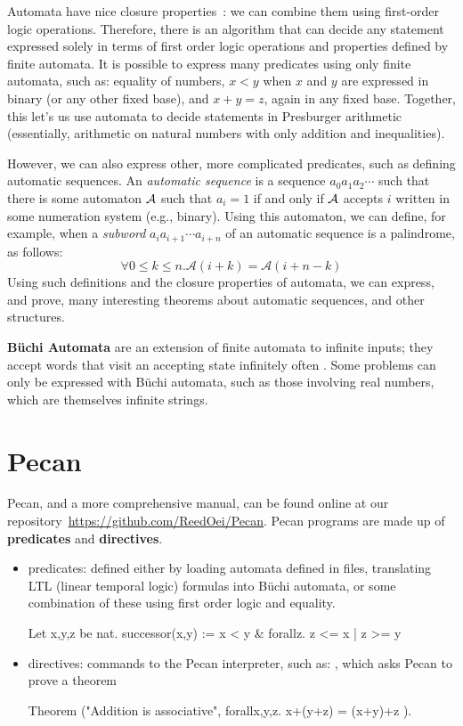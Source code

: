 \documentclass[10pt,usenames,dvipsnames]{article}
\begin{document}
Automata have nice closure properties~\cite{aut_theory}: we can combine them using first-order logic operations.
Therefore, there is an algorithm that can decide any statement expressed solely in terms of first order logic operations and properties defined by finite automata.
It is possible to express many predicates using only finite automata, such as: equality of numbers, $x < y$ when $x$ and $y$ are expressed in binary (or any other fixed base), and $x + y = z$, again in any fixed base.
Together, this let's us use automata to decide statements in Presburger arithmetic (essentially, arithmetic on natural numbers with only addition and inequalities).

However, we can also express other, more complicated predicates, such as defining automatic sequences.
An \emph{automatic sequence} is a sequence $a_0 a_1 a_2 \cdots$ such that there is some automaton $\cal A$ such that $a_i = 1$ if and only if $\cal A$ accepts $i$ written in some numeration system (e.g., binary).
Using this automaton, we can define, for example, when a \emph{subword} $a_i a_{i+1} \cdots a_{i+n}$ of an automatic sequence is a palindrome, as follows:
\[
    \forall 0 \leq k \leq n. \mathcal{A}(i + k) = \mathcal{A}(i + n - k)
\]
Using such definitions and the closure properties of automata, we can express, and prove, many interesting theorems about automatic sequences, and other structures.

\textbf{B\"uchi Automata} are an extension of finite automata to infinite inputs; they accept words that visit an accepting state infinitely often \cite{aut_theory}. 
Some problems can only be expressed with B\"uchi automata, such as those involving real numbers, which are themselves infinite strings.

\section{Pecan}

Pecan, and a more comprehensive manual, can be found online at our repository~\url{https://github.com/ReedOei/Pecan}.
Pecan programs are made up of \textbf{predicates} and \textbf{directives}.

\begin{itemize}
    \item predicates: defined either by loading automata defined in files, translating LTL (linear temporal logic) formulas into B\"uchi automata, or some combination of these using first order logic and equality.

\begin{pecan}
Let x,y,z be nat.
successor(x,y) := x < y & forallz. z <= x | z >= y
\end{pecan}

    \item directives: commands to the Pecan interpreter, such as: , which asks Pecan to prove a theorem
    
\begin{pecan}
Theorem ("Addition is associative", { forallx,y,z. x+(y+z) = (x+y)+z }).
\end{pecan}

\end{itemize}
\end{document}
